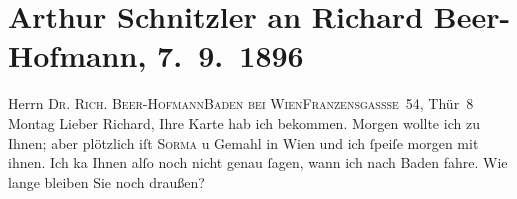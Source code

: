 

         
         \newcommand{\erwaehntePersonen}{Personen: Richard Beer-Hofmann, Otto Brahm, Max Eugen Burckhard, Samuel Fischer, Hugo von Hofmannsthal, Demetrius Mito von Minotto, Agnes Sorma}
         \newcommand{\erwaehnteInstitutionen}{}
         \newcommand{\erwaehnteOrte}{Orte: Altaussee, Baden bei Wien, Berlin, I., Innere Stadt, Kaiser-Franz-Ring, Wien}
         \newcommand{\erwaehnteWerke}{Werke: Freiwild. Schauspiel in 3 Akten}
               \section[Arthur Schnitzler an Richard Beer-Hofmann, 7. 9. 1896]{ Arthur Schnitzler an Richard Beer-Hofmann, 7. 9. 1896}\nopagebreak{}\rehead{ }\begin{ledgroupsized}[t]{13cm}\normalsize\beginnumbering \toendnotes[C]{\smallbreak\pagebreak[2]} 
\toendnotes[C]{\smallbreak}\pstart{}{\pb}Herrn \textsc{Dr. Rich.
                     Beer-Hofmann}\pend{}\pstart{}\textsc{Baden bei Wien}\pend{}\pstart{}\textsc{Franzensgassse 54}, Thür 8\pend{}{\bigskip}\pstart
           \raggedleft{}{\pb}Montag\pend
           \pstart
           Lieber Richard, Ihre Karte hab ich bekommen. Morgen wollte ich zu
               Ihnen; aber plötzlich iſt \textsc{Sorma} u Gemahl in Wien und ich ſpeiſe morgen mit ihnen. Ich ka{\geminationn} Ihnen alſo noch nicht genau ſagen, wann ich nach Baden fahre. Wie lange bleiben Sie noch draußen?

\end{ledgroupsized}
